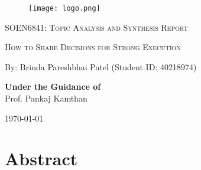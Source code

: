 \documentclass[12pt]{article}
\begin{document}
\begin{titlepage}
    \centering
    \begin{figure}[h] %
    \centering      %
    \texttt{[image: logo.png]}
    \label{fig2}
    \end{figure}
    \vspace{2cm}
    {\scshape\Large SOEN6841: Topic Analysis and Synthesis Report \par}
    \vspace{1.5cm}
    {\scshape\Huge How to Share Decisions for Strong Execution\par}
    \vspace{1.5cm}
    \vspace{0.5cm}
    {\large By: Brinda Pareshbhai Patel (Student ID: 40218974)\par}
    \vspace{2.5cm}
    \textbf{\large Under the Guidance of}\\[0.15in]
    Prof. Pankaj Kamthan\\[0.4in]
    \vspace{1cm}
    {\large \today\par}
\end{titlepage}

\tableofcontents
\newpage

\section*{Abstract}
\end{document}
